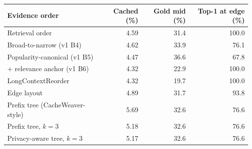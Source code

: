 \begin{tabular}{@{}l r r r@{}}
\toprule
Evidence order & Cached (\%) & Gold mid (\%) & Top-1 at edge (\%) \\
\midrule
Retrieval order & 4.59 & 31.4 & 100.0 \\
Broad-to-narrow (v1 B4) & 4.62 & 33.9 & 76.1 \\
Popularity-canonical (v1 B5) & 4.47 & 36.6 & 67.8 \\
+ relevance anchor (v1 B6) & 4.32 & 22.9 & 100.0 \\
LongContextReorder & 4.32 & 19.7 & 100.0 \\
Edge layout & 4.89 & 31.7 & 93.8 \\
Prefix tree (CacheWeaver-style) & 5.69 & 32.6 & 76.6 \\
Prefix tree, $k{=}3$ & 5.18 & 32.6 & 76.6 \\
Privacy-aware tree, $k{=}3$ & 5.17 & 32.6 & 76.6 \\
\bottomrule
\end{tabular}
